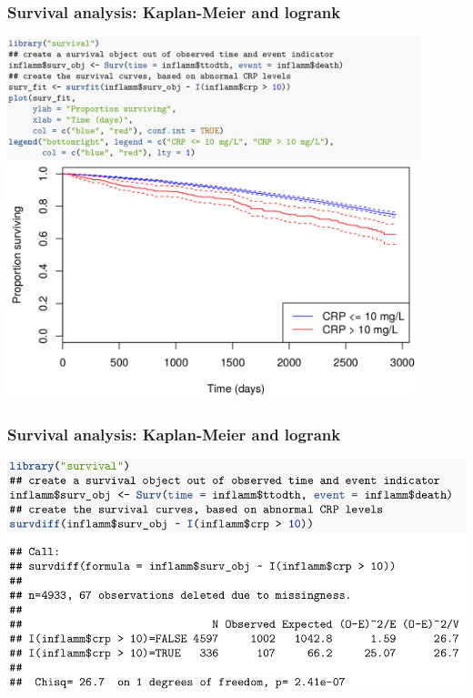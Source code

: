 \documentclass[12pt, 
hyperref={colorlinks=true, linkcolor=blue, urlcolor=cyan},dvipsnames]{beamer}
\begin{document}
\begin{frame}
\frametitle{Survival analysis: Kaplan-Meier and logrank}
\hspace*{0.5cm}\includegraphics[width=0.9\textwidth]{figs/inflamm_km_crp.png}
\end{frame}

\begin{frame}
\frametitle{Survival analysis: Kaplan-Meier and logrank}
\includegraphics[width = 1\textwidth]{figs/inflamm_logrank_crp.png}
\end{frame}
\end{document}
